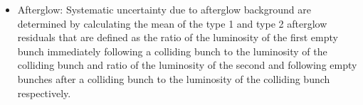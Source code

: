 \begin{itemize}
\newpage
\item Afterglow: Systematic uncertainty due to afterglow background are determined by calculating the mean of the type 1 and type 2 afterglow residuals that are defined as the ratio of the luminosity of the first empty bunch immediately following a colliding bunch to the luminosity of the colliding bunch and ratio of the luminosity of the second and following empty bunches after a colliding bunch to the luminosity of the colliding bunch respectively.





\end{itemize}
